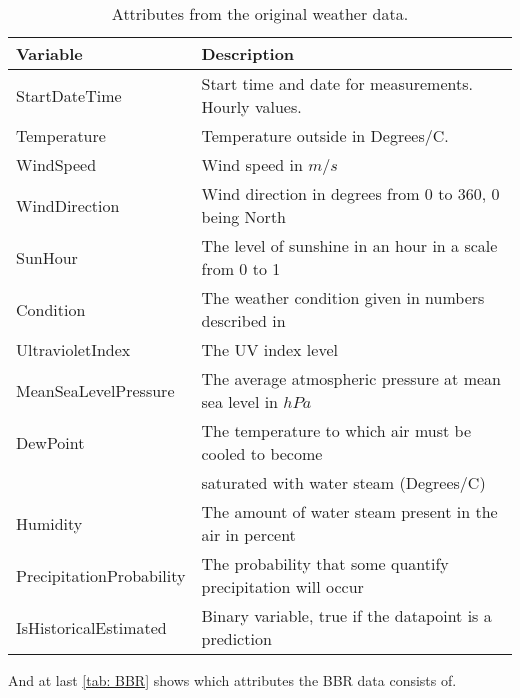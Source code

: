 \begin{table}[H]
    \centering
    \begin{tabular}{ll}
     \hline
     \textbf{Variable} & \textbf{Description} \\
    \hline
    \hline
    StartDateTime  &  Start time and date for measurements. Hourly values.\\
    Temperature  &  Temperature outside in Degrees/C. \\
    WindSpeed  & Wind speed in $m/s$\\
    WindDirection  & Wind direction in degrees from 0 to 360, 0 being North \\
    SunHour  & The level of sunshine in an hour in a scale from 0 to 1 \\
    Condition  & The weather condition given in numbers described in \cite{condition} \\
    UltravioletIndex  & The UV index level \\
    MeanSeaLevelPressure  & The average atmospheric pressure at mean sea level in $hPa$ \\
    DewPoint  &  The temperature to which air must be cooled to become \\ & saturated with water steam (Degrees/C)\\
    Humidity  & The amount of water steam present in the air in percent\\
    PrecipitationProbability & The probability that some quantify precipitation will occur\\
    IsHistoricalEstimated & Binary variable, true if the datapoint is a prediction \\
    \hline
    \end{tabular}
    \caption{Attributes from the original weather data.}
    \label{tab: weatherdata}
\end{table}
\noindent And at last \cref{tab: BBR} shows which attributes the BBR data consists of.

